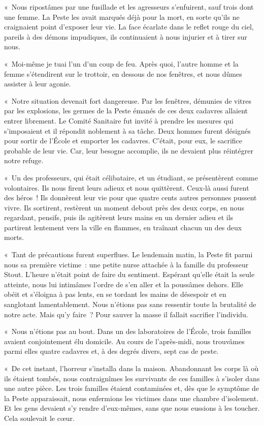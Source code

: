 \documentclass[french,twoside]{book} %
\begin{document}
« Nous ripostâmes par une fusillade et les agresseurs s’enfuirent, sauf trois dont une femme. La Peste les avait marqués déjà pour la mort, en sorte qu’ils ne craignaient point d’exposer leur vie. La face écarlate dans le reflet rouge du ciel, pareils à des démons impudiques, ils continuaient à nous injurier et à tirer sur nous.\par
« Moi-même je tuai l’un d’un coup de feu. Après quoi, l’autre homme et la femme s’étendirent sur le trottoir, en dessous de nos fenêtres, et nous dûmes assister à leur agonie.\par
« Notre situation devenait fort dangereuse. Par les fenêtres, démunies de vitres par les explosions, les germes de la Peste émanés de ces deux cadavres allaient entrer librement. Le Comité Sanitaire fut invité à prendre les mesures qui s’imposaient et il répondit noblement à sa tâche. Deux hommes furent désignés pour sortir de l’École et emporter les cadavres. C’était, pour eux, le sacrifice probable de leur vie. Car, leur besogne accomplie, ils ne devaient plus réintégrer notre refuge.\par
« Un des professeurs, qui était célibataire, et un étudiant, se présentèrent comme volontaires. Ils nous firent leurs adieux et nous quittèrent. Ceux-là aussi furent des héros ! Ils donnèrent leur vie pour que quatre cents autres personnes pussent vivre. Ils sortirent, restèrent un moment debout près des deux corps, en nous regardant, pensifs, puis ils agitèrent leurs mains en un dernier adieu et ils partirent lentement vers la ville en flammes, en traînant chacun un des deux morts.\par
« Tant de précautions furent superflues. Le lendemain matin, la Peste fit parmi nous sa première victime : une petite nurse attachée à la famille du professeur Stout. L’heure n’était point de faire du sentiment. Espérant qu’elle était la seule atteinte, nous lui intimâmes l’ordre de s’en aller et la poussâmes dehors. Elle obéit et s’éloigna à pas lents, en se tordant les mains de désespoir et en sanglotant lamentablement. Nous n’étions pas sans ressentir toute la brutalité de notre acte. Mais qu’y faire ? Pour sauver la masse il fallait sacrifier l’individu.\par
« Nous n’étions pas au bout. Dans un des laboratoires de l’École, trois familles avaient conjointement élu domicile. Au cours de l’après-midi, nous trouvâmes parmi elles quatre cadavres et, à des degrés divers, sept cas de peste.\par
« De cet instant, l’horreur s’installa dans la maison. Abandonnant les corps là où ils étaient tombés, nous contraignîmes les survivants de ces familles à s’isoler dans une autre pièce. Les trois familles étaient contaminées et, dès que le symptôme de la Peste apparaissait, nous enfermions les victimes dans une chambre d’isolement. Et les gens devaient s’y rendre d’eux-mêmes, sans que nous eussions à les toucher. Cela soulevait le cœur.\par
\end{document}
